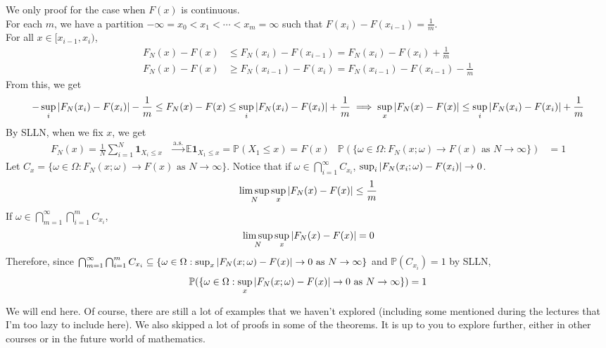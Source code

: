 \documentclass{huhtakm-template-book}
\newcommand{\prob}{\mathbb{P}}
\newcommand{\expect}{\mathbb{E}}
\begin{document}
\begin{proofing}
	We only proof for the case when $F(x)$ is continuous.\\
	For each $m$, we have a partition $-\infty=x_{0}<x_{1}<\cdots<x_{m}=\infty$ such that $F(x_{i})-F(x_{i-1})=\frac{1}{m}$.\\
	For all $x\in[x_{i-1},x_{i})$,
	\begin{align*}
		F_{N}(x)-F(x)&\leq F_{N}(x_{i})-F(x_{i-1})=F_{N}(x_{i})-F(x_{i})+\frac{1}{m}\\
		F_{N}(x)-F(x)&\geq F_{N}(x_{i-1})-F(x_{i})=F_{N}(x_{i-1})-F(x_{i-1})-\frac{1}{m}
	\end{align*}
	From this, we get
	\begin{equation*}
		-\sup_{i}\left|{F_{N}(x_{i})-F(x_{i})}\right|-\frac{1}{m}\leq F_{N}(x)-F(x)\leq\sup_{i}\left|{F_{N}(x_{i})-F(x_{i})}\right|+\frac{1}{m}\implies\sup_{x}\left|{F_{N}(x)-F(x)}\right|\leq\sup_{i}\left|{F_{N}(x_{i})-F(x_{i})}\right|+\frac{1}{m}
	\end{equation*}
	By SLLN, when we fix $x$, we get
	\begin{align*}
		F_{N}(x)=\frac{1}{N}\sum_{i=1}^{N}\mathbf{1}_{X_{i}\leq x}&\xrightarrow{\text{a.s.}}\expect\mathbf{1}_{X_{1}\leq x}=\prob(X_{1}\leq x)=F(x) & \prob(\{\omega\in\Omega:F_{N}(x;\omega)\to F(x)\text{ as }N\to\infty\})&=1
	\end{align*}
	Let $C_{x}=\{\omega\in\Omega:F_{N}(x;\omega)\to F(x)\text{ as }N\to\infty\}$. Notice that if $\omega\in\bigcap_{i=1}^{\infty}C_{x_{i}}$, $\sup_{i}\left|{F_{N}(x_{i};\omega)-F(x_{i})}\right|\to 0$.
	\begin{equation*}
		\limsup_{N}\sup_{x}\left|{F_{N}(x)-F(x)}\right|\leq\frac{1}{m}
	\end{equation*}
	If $\omega\in\bigcap_{m=1}^{\infty}\bigcap_{i=1}^{m}C_{x_{i}}$,
	\begin{equation*}
		\limsup_{N}\sup_{x}\left|{F_{N}(x)-F(x)}\right|=0
	\end{equation*}
	Therefore, since $\bigcap_{m=1}^{\infty}\bigcap_{i=1}^{m}C_{x_{i}}\subseteq\{\omega\in\Omega:\sup_{x}\left|{F_{N}(x;\omega)-F(x)}\right|\to 0\text{ as }N\to\infty\}$ and $\prob(C_{x_{i}})=1$ by SLLN,
	\begin{equation*}
		\prob(\{\omega\in\Omega:\sup_{x}\abs{F_{N}(x;\omega)-F(x)}\to 0\text{ as }N\to\infty\})=1
	\end{equation*}
\end{proofing}
We will end here. Of course, there are still a lot of examples that we haven't explored (including some mentioned during the lectures that I'm too lazy to include here). We also skipped a lot of proofs in some of the theorems. It is up to you to explore further, either in other courses or in the future world of mathematics.
\end{document}
